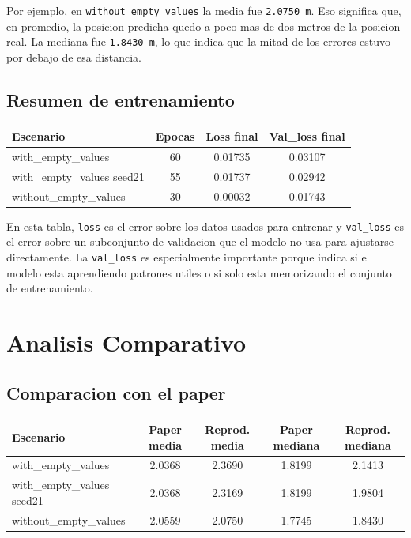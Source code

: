 \documentclass[11pt,a4paper]{article}
\begin{document}
Por ejemplo, en \texttt{without\_empty\_values} la media fue \texttt{2.0750 m}. Eso significa que, en promedio, la posicion predicha quedo a poco mas de dos metros de la posicion real. La mediana fue \texttt{1.8430 m}, lo que indica que la mitad de los errores estuvo por debajo de esa distancia.

\subsection{Resumen de entrenamiento}
\begin{center}
\begin{tabular}{>{\raggedright\arraybackslash}p{4.2cm}ccc}
\toprule
Escenario & Epocas & Loss final & Val\_loss final \\
\midrule
with\_empty\_values & 60 & 0.01735 & 0.03107 \\
with\_empty\_values seed21 & 55 & 0.01737 & 0.02942 \\
without\_empty\_values & 30 & 0.00032 & 0.01743 \\
\bottomrule
\end{tabular}
\end{center}

En esta tabla, \texttt{loss} es el error sobre los datos usados para entrenar y \texttt{val\_loss} es el error sobre un subconjunto de validacion que el modelo no usa para ajustarse directamente. La \texttt{val\_loss} es especialmente importante porque indica si el modelo esta aprendiendo patrones utiles o si solo esta memorizando el conjunto de entrenamiento.

\section{Analisis Comparativo}
\subsection{Comparacion con el paper}
\begin{center}
\begin{tabular}{>{\raggedright\arraybackslash}p{4.2cm}cccc}
\toprule
Escenario & Paper media & Reprod. media & Paper mediana & Reprod. mediana \\
\midrule
with\_empty\_values & 2.0368 & 2.3690 & 1.8199 & 2.1413 \\
with\_empty\_values seed21 & 2.0368 & 2.3169 & 1.8199 & 1.9804 \\
without\_empty\_values & 2.0559 & 2.0750 & 1.7745 & 1.8430 \\
\bottomrule
\end{tabular}
\end{center}
\end{document}
